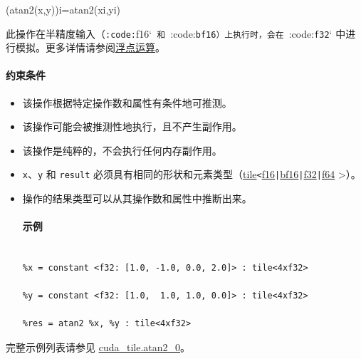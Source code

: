 \documentclass{article}
\begin{document}
(atan2(x,y))i=atan2(xi,yi)


此操作在半精度输入（\texttt{:code:}f16`\texttt{ 和 }:code:\texttt{bf16}\texttt{）上执行时，会在 }:code:\texttt{f32}` 中进行模拟。更多详情请参阅\href{https://docs.nvidia.com/cuda/tile-ir/latest/sections/operations.html#op-group-floating-point}{浮点运算}。





\paragraph{约束条件}


\begin{itemize}
\item 该操作根据特定操作数和属性有条件地可推测。
\item 该操作可能会被推测性地执行，且不产生副作用。
\item 该操作是纯粹的，不会执行任何内存副作用。
\item \texttt{x}、\texttt{y} 和 \texttt{result} 必须具有相同的形状和元素类型（\href{https://docs.nvidia.com/cuda/tile-ir/latest/sections/types.html#type-tile}{tile}\texttt{<}\href{https://docs.nvidia.com/cuda/tile-ir/latest/sections/types.html#subsection-element-types}{f16}\texttt{|}\href{https://docs.nvidia.com/cuda/tile-ir/latest/sections/types.html#subsection-element-types}{bf16}\texttt{|}\href{https://docs.nvidia.com/cuda/tile-ir/latest/sections/types.html#subsection-element-types}{f32}\texttt{|}\href{https://docs.nvidia.com/cuda/tile-ir/latest/sections/types.html#subsection-element-types}{f64} >）。
\item 操作的结果类型可以从其操作数和属性中推断出来。




\paragraph{示例}


\begin{lstlisting}

%x = constant <f32: [1.0, -1.0, 0.0, 2.0]> : tile<4xf32>

%y = constant <f32: [1.0,  1.0, 1.0, 0.0]> : tile<4xf32>

%res = atan2 %x, %y : tile<4xf32>

\end{lstlisting}



\end{itemize}
完整示例列表请参见 \href{https://docs.nvidia.com/cuda/tile-ir/latest/sections/appendix.html#example-cuda-tile-atan2-0}{cuda\_tile.atan2\_0}。
\end{document}
